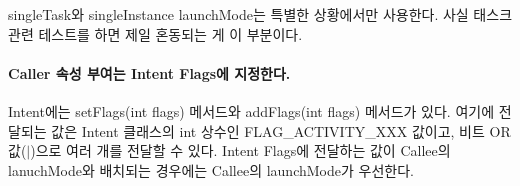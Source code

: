 singleTask와 singleInstance launchMode는 특별한 상황에서만 사용한다. 사실 태스크 관련 테스트를 하면 제일 혼동되는 게 이 부분이다.

\paragraph{Caller 속성 부여는 Intent Flags에 지정한다.}
Intent에는 setFlags(int flags) 메서드와 addFlags(int flags) 메서드가 있다. 여기에 전달되는 값은 Intent 클래스의 int 상수인 FLAG\_ACTIVITY\_XXX 값이고, 비트 OR 값($|$)으로 여러 개를 전달할 수 있다. 
Intent Flags에 전달하는 값이 Callee의 lanuchMode와 배치되는 경우에는 Callee의 launchMode가 우선한다.\\

